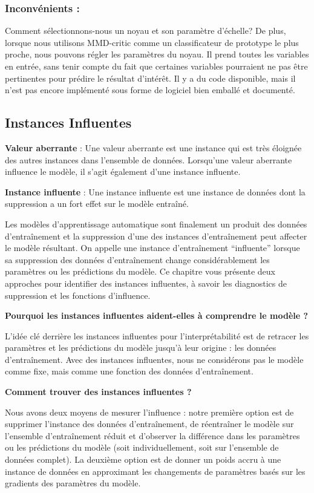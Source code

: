 \subsubsection{Inconvénients :}
Comment sélectionnons-nous un noyau et son paramètre d'échelle? De plus, lorsque nous utilisons MMD-critic comme un classificateur de prototype le plus proche, nous pouvons régler les paramètres du noyau. Il prend toutes les variables en entrée, sans tenir compte du fait que certaines variables pourraient ne pas être pertinentes pour prédire le résultat d'intérêt. Il y a du code disponible, mais il n'est pas encore implémenté sous forme de logiciel bien emballé et documenté.


\subsection{Instances Influentes}

\textbf{Valeur aberrante} : Une valeur aberrante est une instance qui est très éloignée des autres instances dans l'ensemble de données. Lorsqu'une valeur aberrante influence le modèle, il s'agit également d'une instance influente.

\textbf{Instance influente} : Une instance influente est une instance de données dont la suppression a un fort effet sur le modèle entraîné.

Les modèles d'apprentissage automatique sont finalement un produit des données d'entraînement et la suppression d'une des instances d'entraînement peut affecter le modèle résultant. On appelle une instance d'entraînement ``influente'' lorsque sa suppression des données d'entraînement change considérablement les paramètres ou les prédictions du modèle. Ce chapitre vous présente deux approches pour identifier des instances influentes, à savoir les diagnostics de suppression et les fonctions d'influence.


\textbf{Pourquoi les instances influentes aident-elles à comprendre le modèle ?}

L'idée clé derrière les instances influentes pour l'interprétabilité est de retracer les paramètres et les prédictions du modèle jusqu'à leur origine : les données d'entraînement. Avec des instances influentes, nous ne considérons pas le modèle comme fixe, mais comme une fonction des données d'entraînement.

\textbf{Comment trouver des instances influentes ?}

Nous avons deux moyens de mesurer l'influence : notre première option est de supprimer l'instance des données d'entraînement, de réentraîner le modèle sur l'ensemble d'entraînement réduit et d'observer la différence dans les paramètres ou les prédictions du modèle (soit individuellement, soit sur l'ensemble de données complet). La deuxième option est de donner un poids accru à une instance de données en approximant les changements de paramètres basés sur les gradients des paramètres du modèle.


